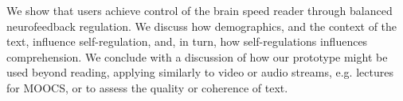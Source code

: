 

We show that users achieve control of the brain speed reader through balanced neurofeedback regulation. We discuss how demographics, and the context of the text, influence self-regulation, and, in turn, how self-regulations influences comprehension. We conclude with a discussion of how our prototype might be used beyond reading, applying similarly to video or audio streams, e.g. lectures for MOOCS, or to assess the quality or coherence of text.




